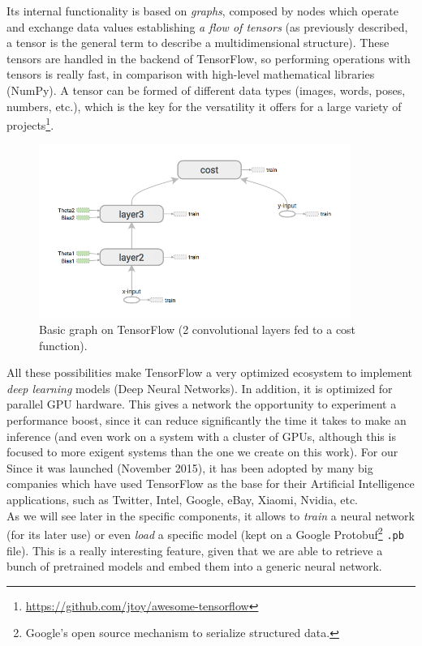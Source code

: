 	Its internal functionality is based on \emph{graphs}, composed by nodes which operate and exchange data values establishing \emph{a flow of tensors} (as previously described, a tensor is the general term to describe a multidimensional structure). These tensors are handled in the backend of TensorFlow, so performing operations with tensors is really fast, in comparison with high-level mathematical libraries (NumPy). A tensor can be formed of different data types (images, words, poses, numbers, etc.), which is the key for the versatility it offers for a large variety of projects\footnote{\url{https://github.com/jtoy/awesome-tensorflow}}.\\
	
	\begin{figure}[h]
		\centering
		\includegraphics[width=4in]{images/tf_graph}
		\caption{Basic graph on TensorFlow (2 convolutional layers fed to a cost function).}
		\label{fig:3_tf_graph}
	\end{figure}
	
	All these possibilities make TensorFlow a very optimized ecosystem to implement \emph{deep learning} models (Deep Neural Networks). In addition, it is optimized for parallel GPU hardware. This gives a network the opportunity to experiment a performance boost, since it can reduce significantly the time it takes to make an inference (and even work on a system with a cluster of GPUs, although this is focused to more exigent systems than the one we create on this work). For our\\
	
	Since it was launched (November 2015), it has been adopted by many big companies which have used TensorFlow as the base for their Artificial Intelligence applications, such as Twitter, Intel, Google, eBay, Xiaomi, Nvidia, etc.\\
	
	As we will see later in the specific components, it allows to \emph{train} a neural network (for its later use) or even \emph{load} a specific model (kept on a Google Protobuf\footnote{Google's open source mechanism to serialize structured data.} \texttt{.pb} file). This is a really interesting feature, given that we are able to retrieve a bunch of pretrained models and embed them into a generic neural network.\\
	

